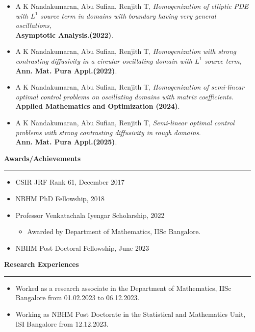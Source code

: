 \documentclass[a4paper,11pt]{letter}
\begin{document}
	\begin{itemize}
		
		\item A K Nandakumaran, Abu Sufian, Renjith T, \textit{Homogenization of elliptic PDE with $L^1$ source term in domains with boundary having very general oscillations,}\\
		\textbf{Asymptotic Analysis.(2022)}.
		
		\item A K Nandakumaran, Abu Sufian, Renjith T, \textit{Homogenization with strong contrasting diffusivity in a circular oscillating domain with $L^1$ source term,}\\
		\textbf{Ann. Mat. Pura Appl.(2022)}.
		
		\item A K Nandakumaran, Abu Sufian, Renjith T, \textit{Homogenization of semi-linear optimal control problems on oscillating domains with matrix coefficients.}\\
		\textbf{Applied Mathematics and Optimization (2024)}.
		
		\item A K Nandakumaran, Abu Sufian, Renjith T, \textit{Semi-linear optimal control problems with strong contrasting diffusivity in rough domains.}\\
		\textbf{Ann. Mat. Pura Appl.(2025)}.
	\end{itemize}

	\textbf{\large Awards/Achievements}\smallskip\hrule
	
	\begin{itemize}
		\item CSIR JRF Rank 61, December 2017
		\item NBHM PhD Fellowship, 2018
		\item Professor Venkatachala Iyengar Scholarship, 2022
		\begin{itemize}
			\item Awarded by Department of Mathematics, IISc Bangalore.
		\end{itemize}
		\item NBHM Post Doctoral Fellowship, June 2023
	\end{itemize}

	\newpage
	
	\textbf{\large Research Experiences}\smallskip\hrule
	
	\begin{itemize}
		\item Worked as a research associate in the Department of Mathematics, IISc Bangalore from 01.02.2023 to 06.12.2023.
		\item Working as NBHM Post Doctorate in the Statistical and Mathematics Unit, ISI Bangalore from 12.12.2023.
	\end{itemize}
\end{document}
